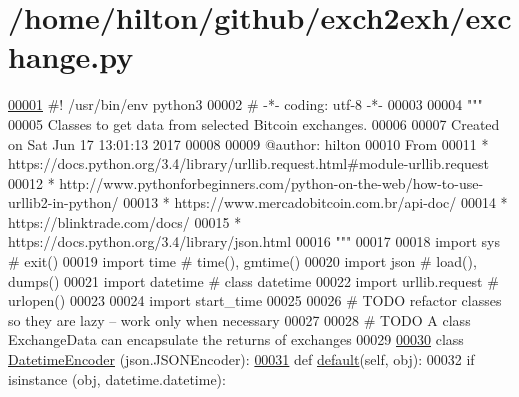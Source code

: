 \hypertarget{exchange_8py_source}{}\section{/home/hilton/github/exch2exh/exchange.py}

\begin{DoxyCode}
\hyperlink{namespaceexchange}{00001} \textcolor{comment}{#! /usr/bin/env python3 }
00002 \textcolor{comment}{# -*- coding: utf-8 -*-}
00003 
00004 \textcolor{stringliteral}{"""}
00005 \textcolor{stringliteral}{Classes to get data from selected Bitcoin exchanges.}
00006 \textcolor{stringliteral}{}
00007 \textcolor{stringliteral}{Created on Sat Jun 17 13:01:13 2017}
00008 \textcolor{stringliteral}{}
00009 \textcolor{stringliteral}{@author: hilton}
00010 \textcolor{stringliteral}{From }
00011 \textcolor{stringliteral}{* https://docs.python.org/3.4/library/urllib.request.html#module-urllib.request}
00012 \textcolor{stringliteral}{* http://www.pythonforbeginners.com/python-on-the-web/how-to-use-urllib2-in-python/}
00013 \textcolor{stringliteral}{* https://www.mercadobitcoin.com.br/api-doc/}
00014 \textcolor{stringliteral}{* https://blinktrade.com/docs/}
00015 \textcolor{stringliteral}{* https://docs.python.org/3.4/library/json.html}
00016 \textcolor{stringliteral}{"""}
00017 
00018 \textcolor{keyword}{import} sys            \textcolor{comment}{# exit()}
00019 \textcolor{keyword}{import} time           \textcolor{comment}{# time(), gmtime()}
00020 \textcolor{keyword}{import} json           \textcolor{comment}{# load(), dumps()}
00021 \textcolor{keyword}{import} datetime       \textcolor{comment}{# class datetime}
00022 \textcolor{keyword}{import} urllib.request \textcolor{comment}{# urlopen()}
00023 
00024 \textcolor{keyword}{import} start\_time
00025 
00026 \textcolor{comment}{# TODO refactor classes so they are lazy -- work only when necessary}
00027 
00028 \textcolor{comment}{# TODO A class ExchangeData can encapsulate the returns of exchanges}
00029 
\hyperlink{classexchange_1_1_datetime_encoder}{00030} \textcolor{keyword}{class }\hyperlink{classexchange_1_1_datetime_encoder}{DatetimeEncoder} (json.JSONEncoder):
\hyperlink{classexchange_1_1_datetime_encoder_a0bb4f94a13ce6c33e8d68869e282d24f}{00031}     \textcolor{keyword}{def }\hyperlink{classexchange_1_1_datetime_encoder_a0bb4f94a13ce6c33e8d68869e282d24f}{default}(self, obj):
00032         \textcolor{keywordflow}{if} isinstance (obj, datetime.datetime):

\end{DoxyCode}
